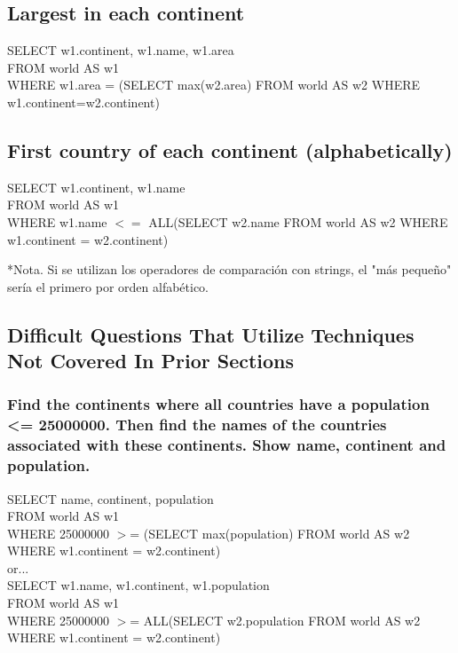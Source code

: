 \documentclass[10pt, oneside]{article}
\begin{document}
\subsection{Largest in each continent}

SELECT w1.continent, w1.name, w1.area\\
FROM world AS w1\\
WHERE w1.area = (SELECT max(w2.area) FROM world AS w2 WHERE w1.continent=w2.continent)\\

\subsection{First country of each continent (alphabetically)}

SELECT w1.continent, w1.name\\
FROM world AS w1\\
\color{red}WHERE w1.name $<=$ ALL(SELECT w2.name FROM world AS w2 WHERE w1.continent = w2.continent)\\\color{blue}

*Nota. \color{black}Si se utilizan los operadores de comparación con strings, el "más pequeño" sería el primero por orden alfabético.

\subsection{Difficult Questions That Utilize Techniques Not Covered In Prior Sections}

\subsubsection{Find the continents where all countries have a population <= 25000000. Then find the names of the countries associated with these continents. Show name, continent and population.}

SELECT name, continent, population\\
FROM world AS w1\\
WHERE 25000000 $>$= (SELECT max(population) FROM world AS w2 WHERE w1.continent = w2.continent)\\

or...\\

SELECT w1.name, w1.continent, w1.population\\
FROM world AS w1\\
WHERE 25000000 $>$= ALL(SELECT w2.population FROM world AS w2 WHERE w1.continent = w2.continent)\\
\end{document}
